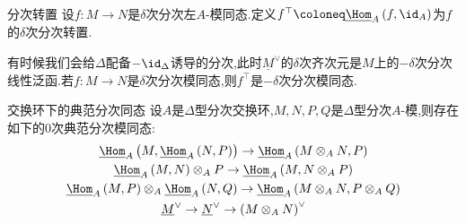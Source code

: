 \begin{definition}{分次转置}{}
	设$f:M\to N$是$\delta$次分次左$A$-模同态.定义$f^{\top}\coloneq\underline{\Hom}_{A}\left(f,\id_{A}\right)$为$f$的$\delta$次分次转置.
\end{definition}

\begin{remark}{}{}
	有时候我们会给$\Delta$配备$-\id_{\Delta}$诱导的分次,此时$\underline{M}^{\vee}$的$\delta$次齐次元是$M$上的$-\delta$次分次线性泛函.若$f:M\to N$是$\delta$次分次模同态,则$f^{\top}$是$-\delta$次分次模同态.
\end{remark}

\begin{proposition}{交换环下的典范分次同态}{}
	设$A$是$\Delta$型分次交换环,$M,N,P,Q$是$\Delta$型分次$A$-模,则存在如下的$0$次典范分次模同态:
	\begin{gather*}
		\underline{\Hom}_{A}\left(M,\underline{\Hom}_{A}\left(N,P\right)\right)\to\underline{\Hom}_{A}\left(M\otimes_{A}N,P\right)\\
		\underline{\Hom}_{A}\left(M,N\right)\otimes_{A}P\to\underline{\Hom}_{A}\left(M,N\otimes_{A}P\right)\\
		\underline{\Hom}_{A}\left(M,P\right)\otimes_{A}\underline{\Hom}_{A}\left(N,Q\right)\to\underline{\Hom}_{A}\left(M\otimes_{A}N,P\otimes_{A}Q\right)\\
		\underline{M}^{\vee}\to\underline{N}^{\vee}\to\left(M\otimes_{A}N\right)^{\vee}
	\end{gather*}
\end{proposition}
